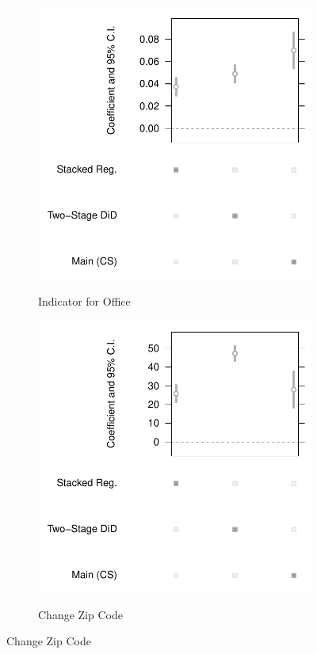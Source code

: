 \documentclass[12pt]{article}
\begin{document}
\begin{figure}[t!]
\medskip
\begin{subfigure}{0.48\textwidth}
\caption{Indicator for Office }
\includegraphics[width=\linewidth]{Objects/office_ind_est_plot.pdf}
 \label{fig:c}
\end{subfigure}\hspace*{\fill}
\begin{subfigure}{0.48\textwidth}
\caption{Change Zip Code} 
\includegraphics[width=\linewidth]{Objects/patient_count_est_plot.pdf}
\label{fig:d}
\end{subfigure}


\end{figure}
\end{document}
